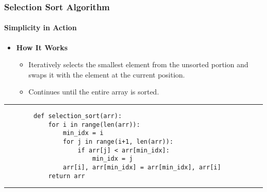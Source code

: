 \documentclass[compress,12pt,bookmark]{beamer}
\begin{document}
\begin{frame}[fragile]
    \frametitle{Selection Sort Algorithm}
    \framesubtitle{Simplicity in Action}

    \begin{itemize}
        \item \textbf{How It Works}
              \begin{itemize}
                  \item Iteratively selects the smallest element from the unsorted portion and swaps it with the element at the current position.
                  \item Continues until the entire array is sorted.
              \end{itemize}
    \end{itemize}

    \rule{\textwidth}{1pt}
    \scriptsize
    \begin{verbatim}
        def selection_sort(arr):
            for i in range(len(arr)):
                min_idx = i
                for j in range(i+1, len(arr)):
                    if arr[j] < arr[min_idx]:
                        min_idx = j
                arr[i], arr[min_idx] = arr[min_idx], arr[i]
            return arr
    \end{verbatim}
    \rule{\textwidth}{1pt}
\end{frame}
\end{document}
